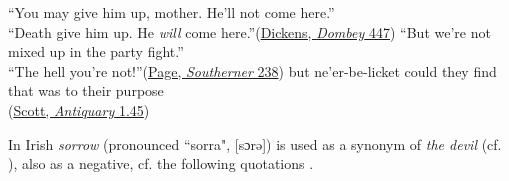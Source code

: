 \ea \label{ex:04-200}
\ea
``You may give him up, mother. He'll not come here.''\\ ``Death give him up. He \textit{will} come here.''\hfill(\href{https://archive.org/details/dombeyson00dick_0/page/696/mode/2up?q=\%22You+may+give+him+up%2C+mother\%22&view=theater}{Dickens, \textit{Dombey} 447})
\ex
``But we're not mixed up in the party fight.''\\``The hell you're not!''\hfill(\href{https://books.google.com/books?id=8UbL0Ikt-HcC&pg=PA238&lpg=PA238&dq=\%22we%27re+not+mixed+up+in+the+party+fight%22}{Page, \textit{Southerner} 238}) %
\ex
but ne'er-be-licket could they find that was to their purpose\\\hfill(\href{https://archive.org/details/antiquary20unkngoog/page/n212/mode/2up?q=\%22could+they+find+that\%22&view=theater}{Scott, \textit{Antiquary} 1.45})
\z
\z

In Irish \textit{sorrow} (pronounced ``sorra", [sɔrə]) is used as a synonym of \textit{the devil} (cf. \cite[\href{https://archive.org/details/englishaswespeak00joycuoft/page/69/mode/2up?view=theater}{70}]{joyce1910english}), also as a negative, cf. the following quotations .


